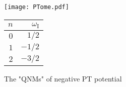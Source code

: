 \documentclass[pr, twocolumn, preprintnumbers, showpacs,footnoteadded, superscriptaddress,nofootinbib,longbibliography]{revtex4-1}
\begin{document}
%
\begin{figure}[hbtp]
\centering
\begin{minipage}{0.48\textwidth}
\centerline{\texttt{[image: PTome.pdf]}}
\end{minipage}
\hfill
\begin{minipage}{0.48\textwidth}
\begin{tabular}{r r}
\hline
  \hline
  $n$ & $\omega_{\text{I}}$ \\
  \hline
 $0$ & $1/2$  \\

 $1$& $-1/2$      \\

 $2$& $-3/2$ \\
 \hline
 \hline
\end{tabular}
\end{minipage}
\caption{The "QNMs" of negative PT potential }\label{PTome}
\end{figure}
\end{document}
